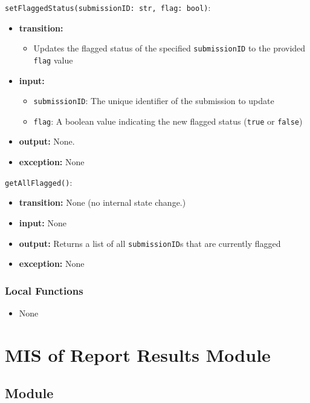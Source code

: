 \documentclass[12pt, titlepage]{article}
\begin{document}
\noindent \texttt{setFlaggedStatus(submissionID: str, flag: bool)}:
\begin{itemize}
    \item \textbf{transition:}
    \begin{itemize}
        \item Updates the flagged status of the specified \texttt{submissionID} to the provided \texttt{flag} value
    \end{itemize}
     \item \textbf{input:} 
    \begin{itemize}
        \item \texttt{submissionID}: The unique identifier of the submission to update
        \item \texttt{flag}: A boolean value indicating the new flagged status (\texttt{true} or \texttt{false})
    \end{itemize}
    \item \textbf{output:} None.
    \item \textbf{exception:} None
\end{itemize}

\noindent \texttt{getAllFlagged()}:
\begin{itemize}
    \item \textbf{transition:} None (no internal state change.)
    \item \textbf{input:} None
    \item \textbf{output:} Returns a list of all \texttt{submissionID}s that are currently flagged
    \item \textbf{exception:} None
\end{itemize}

\subsubsection{Local Functions}
\begin{itemize}
    \item None
\end{itemize}


\section{MIS of Report Results Module} \label{mResults}

\subsection{Module}
\end{document}

